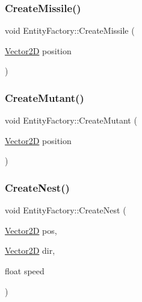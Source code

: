 \hypertarget{class_entity_factory_a09b1b21ae968b6db79f63824f9488091}{}\label{class_entity_factory_a09b1b21ae968b6db79f63824f9488091} 
\subsubsection{\texorpdfstring{Create\+Missile()}{CreateMissile()}}
{\footnotesize\ttfamily void Entity\+Factory\+::\+Create\+Missile (\begin{DoxyParamCaption}\item[{\hyperlink{class_vector2_d}{Vector2D}}]{position }\end{DoxyParamCaption})\hspace{0.3cm}{\ttfamily [static]}}

\hypertarget{class_entity_factory_a9aa7edc76e6f6ee4158ae78b780f1e18}{}\label{class_entity_factory_a9aa7edc76e6f6ee4158ae78b780f1e18} 
\subsubsection{\texorpdfstring{Create\+Mutant()}{CreateMutant()}}
{\footnotesize\ttfamily void Entity\+Factory\+::\+Create\+Mutant (\begin{DoxyParamCaption}\item[{\hyperlink{class_vector2_d}{Vector2D}}]{position }\end{DoxyParamCaption})\hspace{0.3cm}{\ttfamily [static]}}

\hypertarget{class_entity_factory_a855dd969520879d9ea167d854ca30c11}{}\label{class_entity_factory_a855dd969520879d9ea167d854ca30c11} 
\subsubsection{\texorpdfstring{Create\+Nest()}{CreateNest()}}
{\footnotesize\ttfamily void Entity\+Factory\+::\+Create\+Nest (\begin{DoxyParamCaption}\item[{\hyperlink{class_vector2_d}{Vector2D}}]{pos,  }\item[{\hyperlink{class_vector2_d}{Vector2D}}]{dir,  }\item[{float}]{speed }\end{DoxyParamCaption})\hspace{0.3cm}{\ttfamily [static]}}

